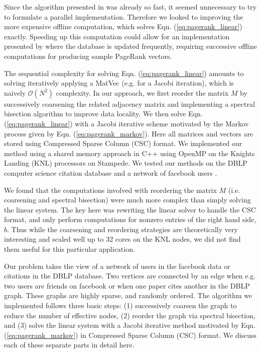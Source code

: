 \documentclass[11pt]{article}
\begin{document}
Since the algorithm presented in \cite{xie} was already so fast, it seemed
unnecessary to try to formulate a parallel implementation. Therefore we looked
to improving the more expensive offline computation, which solves Eqn.
(\ref{eq:pagerank_linear}) exactly. Speeding up this computation could allow for
an implementation presented by \cite{xie} where the database is updated
frequently, requiring successive offline computations for producing sample
PageRank vectors.

The sequential complexity for solving Eqn. (\ref{eq:pagerank_linear}) amounts to
solving iteratively applying a MatVec (e.g. for a Jacobi iteration), which is
naively $\mathcal{O}(N^2)$ complexity. In our approach, we first reorder the
matrix $M$ by successively coarsening the related adjacency matrix and
implementing a spectral bisection algorithm to improve data locality. We then
solve Eqn. (\ref{eq:pagerank_linear}) with a Jacobi iterative scheme motivated
by the Markov process given by Eqn. (\ref{eq:pagerank_markov}). Here all
matrices and vectors are stored using Compressed Sparse Column (CSC) format. We
implemented our method using a shared memory approach in C++ using OpenMP on the Knights Landing (KNL) processors on
Stampede. We tested our methods on the DBLP computer science citation database
\cite{dblp} and a network of facebook users \cite{facebook}. 

We found that the computations involved with reordering the matrix $M$ (i.e.
coarsening and spectral bisection) were much more complex than simply solving
the linear system. The key here was rewriting the linear solver to handle the
CSC format, and only perform computations for nonzero entries of the right hand
side, $b$. Thus while the coarsening and reordering strategies are theoretically
very interesting and scaled well up to 32 cores on the KNL nodes, 
we did not find them useful for this particular application. 



Our problem takes the view of a network of users in the facebook data or
citations in the DBLP database. Two vertices are connected by an edge when e.g. two
users are friends on facebook or when one paper cites another in the DBLP graph.
These graphs are highly sparse, and randomly ordered.
The algorithm we implemented follows three basic steps: (1) successively coarsen
the graph to reduce the number of effective nodes, (2) reorder the graph via
spectral bisection, and (3) solve the linear system with a Jacobi iterative
method motivated by Eqn. (\ref{eq:pagerank_markov}) in Compressed Sparse
Column (CSC) format. We discuss each of these separate parts in detail here. 
\end{document}
